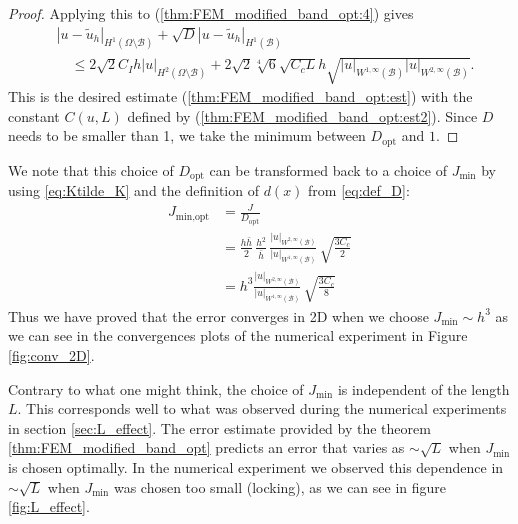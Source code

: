 \documentclass{article}
\theoremstyle{remark}
\def\B{\mathcal{B}}
\def\WIi{W^{1,\infty}}
\def\WIIi{W^{2,\infty}}
\def\tu{\tilde{u}}
\def\opt{\mathrm{opt}}
\def\width{\bar{h}}
\newcommand{\J}{J}
\newcommand{\Jmin}{J_{\text{min}}}
\begin{document}
\begin{proof}
    Applying this to (\ref{thm:FEM_modified_band_opt:4}) gives
    \begin{equation*}
    \begin{split}
    \label{thm:FEM_modified_band_opt:6}
    &|u-\tu_h|_{H^1(\Omega\setminus\B)} +\sqrt{D}|u-\tu_h|_{H^1(\B)}\\
    &\quad\leq 2\sqrt{2}C_I h|u|_{H^2(\Omega\setminus\B)} + 2\sqrt{2}\sqrt[4]{6}\sqrt{C_c L} h \sqrt{|u|_{\WIi(\B)}|u|_{\WIIi(\B)}}.
    \end{split}
    \end{equation*}
    This is the desired estimate (\ref{thm:FEM_modified_band_opt:est}) with the constant $C(u,L)$ defined by (\ref{thm:FEM_modified_band_opt:est2}). Since $D$ needs to be smaller than 1, we take the minimum between $D_\opt$ and $1$.
    \end{proof} \noindent
    
    We note that this choice of $D_\opt$ can be transformed back to a choice of $\Jmin$ by using \eqref{eq:Ktilde_K} and the definition of $d(x)$ from \eqref{eq:def_D}:
    \begin{align} \nonumber
        J_{\text{min,opt}} &= \frac{\J}{D_{\text{opt}}} \\ \nonumber
              &= \frac{h \width}{2} \, \frac{h^2}{\width} \, \frac{|u|_{\WIIi(\B)}}{|u|_{\WIi(\B)}} \, \sqrt{\frac{3C_c}{2}}\\\label{eq:Jminopt}
              &= h^3 \frac{|u|_{\WIIi(\B)}}{|u|_{\WIi(\B)}} \, \sqrt{\frac{3C_c}{8}}
    \end{align}
Thus we have proved that the error converges in 2D when we choose $\Jmin \sim h^3$ as we can see in the convergences plots of the numerical experiment in Figure \ref{fig:conv_2D}.

Contrary to what one might think, the choice of $\Jmin$ is independent of the length $L$. This corresponds well to what was observed during the numerical experiments in section \ref{sec:L_effect}. The error estimate provided by the theorem \ref{thm:FEM_modified_band_opt} predicts an error that varies as $ \sim \sqrt{L}$ when $\Jmin$ is chosen optimally. In the numerical experiment we observed this dependence in $\sim \sqrt{L}$ when $\Jmin$ was chosen too small (locking), as we can see in figure \ref{fig:L_effect}.
\end{document}
